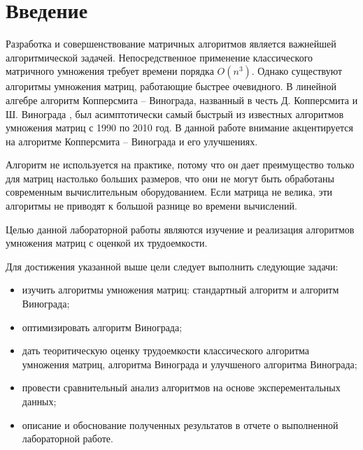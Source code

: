 \chapter*{Введение}

Разработка и совершенствование матричных алгоритмов является важнейшей алгоритмической задачей. Непосредственное применение классического матричного умножения требует времени порядка $O(n^3)$. Однако существуют алгоритмы умножения матриц, работающие быстрее очевидного. В линейной алгебре алгоритм Копперсмита – Винограда\cite{winograd}, названный в честь Д. Копперсмита и Ш. Винограда , был асимптотически самый быстрый из известных алгоритмов умножения матриц с 1990 по 2010 год. В данной работе внимание акцентируется на алгоритме Копперсмита – Винограда и его улучшениях. 

Алгоритм не используется на практике, потому что он дает преимущество только для матриц настолько больших размеров, что они не могут быть обработаны современным вычислительным оборудованием. Если матрица не велика, эти алгоритмы не приводят к большой разнице во времени вычислений.

Целью данной лабораторной работы являются изучение и реализация алгоритмов умножения матриц с оценкой их трудоемкости.

Для достижения указанной выше цели следует выполнить следующие задачи:
\begin{itemize}
	\item изучить алгоритмы умножения матриц: стандартный алгоритм и алгоритм Винограда;
	\item оптимизировать алгоритм Винограда;
	\item дать теоритическую оценку трудоемкости классического алгоритма умножения матриц, алгоритма Винограда и улучшеного алгоритма Винограда;
	\item провести сравнительный анализ алгоритмов на основе эксперементальных данных;
	\item описание и обоснование полученных результатов в отчете о выполненной лабораторной работе.
\end{itemize}

